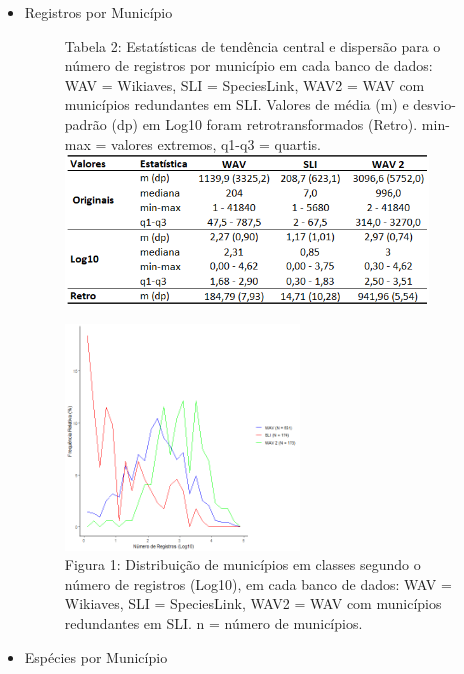\begin{itemize}
    \item Registros por Município

\begin{figure}[h!]
\centering
{\scriptsize Tabela 2: Estatísticas de tendência central e dispersão para o número de registros por município em cada banco de dados: WAV = Wikiaves, SLI = SpeciesLink, WAV2 = WAV com municípios redundantes em SLI. Valores de média (m) e desvio-padrão (dp) em Log10 foram retrotransformados (Retro). min-max = valores extremos, q1-q3 = quartis.}
\includegraphics[height = 4cm]{Tabelas/2.png}
\label{t02}
\end{figure}

\begin{figure}[h!]
\centering
\includegraphics[height = 6cm]{Imagens/113.png}
\\{\scriptsize Figura 1: Distribuição de municípios em classes segundo o número de registros (Log10), em cada banco de dados: WAV = Wikiaves, SLI = SpeciesLink, WAV2 = WAV com municípios redundantes em SLI. n = número de municípios.  }
\label{fig01}
\end{figure}



\item Espécies por Município


\end{itemize}
